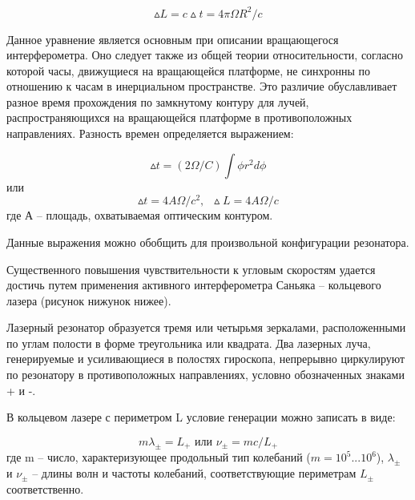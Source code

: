 \documentclass[a4paper,12pt]{article} %
\begin{document}
\begin{equation}
    \vartriangle \!\! L  = c \vartriangle \!\! t = 4 \pi \Omega R^2 / c
\end{equation}

Данное уравнение является основным при описании вращающегося интерферометра. Оно следует также из общей теории относительности, согласно
которой часы, движущиеся на вращающейся платформе, не синхронны по отношению к часам в инерциальном пространстве. Это различие обуславливает
разное время прохождения по замкнутому контуру для лучей, распространяющихся на вращающейся платформе в противоположных направлениях. Разность
времен определяется выражением:

\begin{equation}
    \vartriangle \!\! t = (2\Omega / C) \int \phi r^2 d\phi
\end{equation}
или
\begin{equation}
    \vartriangle \!\! t = 4A\Omega / c^2, \,\,\, \vartriangle \!\! L = 4A\Omega / c
\end{equation}
где А -- площадь, охватываемая оптическим контуром.

Данные выражения можно обобщить для произвольной конфигурации резонатора.

Существенного повышения чувствительности к угловым скоростям удается достичь путем применения активного интерферометра Саньяка – кольцевого
лазера (рисунок нижунок нижее).

Лазерный резонатор образуется тремя или четырьмя зеркалами, расположенными по углам полости в форме треугольника или квадрата. Два лазерных луча, генерируемые и усиливающиеся в полостях гироскопа, непрерывно циркулируют по резонатору в противоположных направлениях, условно обозначенных знаками + и -.

В кольцевом лазере с периметром L условие генерации можно записать в
виде:

\begin{equation}
    m \lambda_\pm = L_+ \text{ или } \nu_\pm = mc / L_+
\end{equation}
где m – число, характеризующее продольный тип колебаний ($m = 10^5...10^6$),
$\lambda_\pm$ и $\nu_\pm$ -- длины волн и частоты колебаний, соответствующие периметрам $L_\pm$ соответственно.
\end{document}
